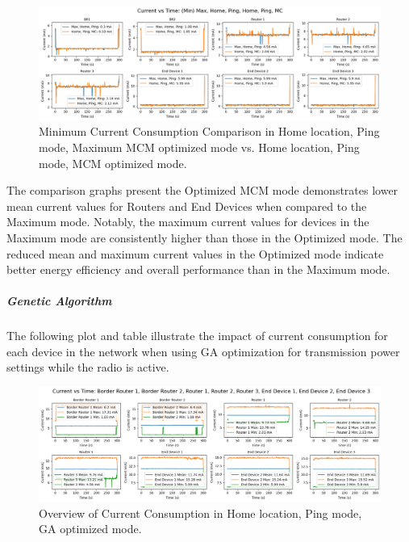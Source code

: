 \begin{figure}[H]
  \centering
  \includegraphics[width=1\textwidth]{images/research_results/current_consumption_analysis/optimized/home/ping/mc/comparison/min_comparison_home_ping_max_vs_home_ping_mc.png}
    \caption{Minimum Current Consumption Comparison in Home location, Ping mode, Maximum MCM optimized mode vs. Home location, Ping mode, MCM optimized mode.}
    \label{fig:min_comparison_home_ping_max_vs_home_ping_mc}
\end{figure}

The comparison graphs present the Optimized MCM mode demonstrates lower mean current values for Routers and End Devices when compared to the Maximum mode. Notably, the maximum current values for devices in the Maximum mode are consistently higher than those in the Optimized mode. The reduced mean and maximum current values in the Optimized mode indicate better energy efficiency and overall performance than in the Maximum mode.

\subparagraph{Genetic Algorithm}
The following plot and table illustrate the impact of current consumption for each device in the network when using GA optimization for transmission power settings while the radio is active.

\begin{figure}[H]
  \centering
  \includegraphics[width=1\textwidth]{images/research_results/current_consumption_analysis/optimized/home/ping/ga/overview.png}
    \caption{Overview of Current Consumption in Home location, Ping mode, GA optimized mode.}
    \label{fig:overview_home_ping_ga_overview}
\end{figure}

